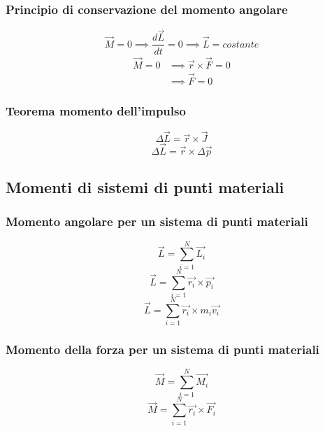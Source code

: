 \documentclass[twoside]{article}
\begin{document}
\subsubsection{Principio di conservazione del momento angolare}
\begin{equation}
  \boxed{\vec{M} = 0 \implies \frac{d\vec{L}}{dt} = 0 \implies \vec{L} = costante}
\end{equation}
\begin{align*}
  \vec{M} = 0 & \implies \vec{r} \times \vec{F} = 0 \\
              & \implies \vec{F} = 0
\end{align*}
\subsubsection{Teorema momento dell'impulso}
\begin{equation}
  \boxed{ \Delta \vec{L} = \vec{r} \times \vec{J}}
\end{equation}
\begin{equation*}
  \Delta \vec{L} = \vec{r} \times \Delta \vec{p}
\end{equation*}
\subsection{Momenti di sistemi di punti materiali}
\subsubsection{Momento angolare per un sistema di punti materiali}
\begin{equation}
  \boxed{\vec{L} = \sum_{i=1}^{N} \vec{L_i}}
\end{equation}
\begin{equation*}
  \vec{L} = \sum_{i=1}^{N} \vec{r_i} \times \vec{p_i}
\end{equation*}
\begin{equation*}
  \vec{L} = \sum_{i=1}^{N} \vec{r_i} \times m_i \vec{v_i}
\end{equation*}
\subsubsection{Momento della forza per un sistema di punti materiali}
\begin{equation}
  \boxed{\vec{M} = \sum_{i=1}^{N} \vec{M_i}}
\end{equation}
\begin{equation*}
  \vec{M} = \sum_{i=1}^{N} \vec{r_i} \times \vec{F_i}
\end{equation*}
\end{document}
